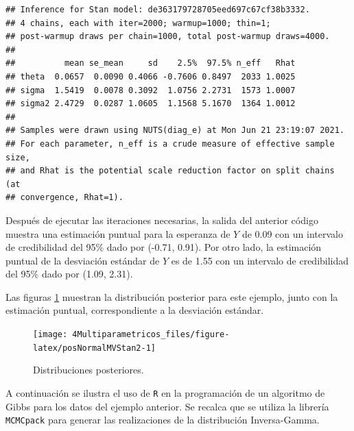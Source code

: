 \documentclass[
  10pt,
  spanish,
]{book}
\theoremstyle{definition}
\theoremstyle{definition}
\theoremstyle{definition}
\theoremstyle{definition}
\theoremstyle{remark}
\begin{document}
\begin{verbatim}
## Inference for Stan model: de363179728705eed697c67cf38b3332.
## 4 chains, each with iter=2000; warmup=1000; thin=1; 
## post-warmup draws per chain=1000, total post-warmup draws=4000.
## 
##          mean se_mean     sd    2.5%  97.5% n_eff   Rhat
## theta  0.0657  0.0090 0.4066 -0.7606 0.8497  2033 1.0025
## sigma  1.5419  0.0078 0.3092  1.0756 2.2731  1573 1.0007
## sigma2 2.4729  0.0287 1.0605  1.1568 5.1670  1364 1.0012
## 
## Samples were drawn using NUTS(diag_e) at Mon Jun 21 23:19:07 2021.
## For each parameter, n_eff is a crude measure of effective sample size,
## and Rhat is the potential scale reduction factor on split chains (at 
## convergence, Rhat=1).
\end{verbatim}

Después de ejecutar las iteraciones necesarias, la salida del anterior código muestra una estimación puntual para la esperanza de \(Y\) de 0.09 con un intervalo de credibilidad del 95\% dado por (-0.71, 0.91). Por otro lado, la estimación puntual de la desviación estándar de \(Y\) es de 1.55 con un intervalo de credibilidad del 95\% dado por (1.09, 2.31).

Las figuras \ref{fig:posNormalMVStan2} muestran la distribución posterior para este ejemplo, junto con la estimación puntual, correspondiente a la desviación estándar.

\begin{figure}

{\centering \texttt{[image: 4Multiparametricos\_files/figure-latex/posNormalMVStan2-1]} 

}

\caption{Distribuciones posteriores.}\label{fig:posNormalMVStan2}
\end{figure}

A continuación se ilustra el uso de \texttt{R} en la programación de un algoritmo de Gibbs para los datos del ejemplo anterior. Se recalca que se utiliza la librería \texttt{MCMCpack} \citep{MCMCpack} para generar las realizaciones de la distribución Inversa-Gamma.
\end{document}
